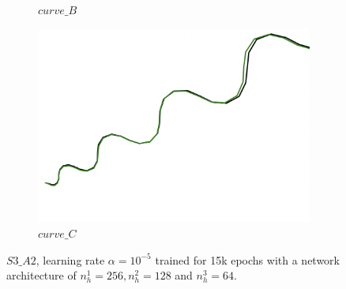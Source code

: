 \begin{figure}[H]
\begin{subfigure}[b]{0.31\textwidth}
         \caption{$curve\_B$}
     \end{subfigure}
     \hfill
     \begin{subfigure}[b]{0.31\textwidth}
         \centering
         \includegraphics[width=\textwidth]{images/bc_curve_results/S3_A2_256_128_64_curve_C.png}
         \caption{$curve\_C$}
     \end{subfigure}
        \caption{$S3\_A2$, learning rate $\alpha = 10^{-5}$ trained for 15k epochs with a network architecture of $n_{h}^{1}=256, n_{h}^{2}=128$ and $n_{h}^{3}=64$.}
        \label{fig:bcCurves2}
\end{figure}

